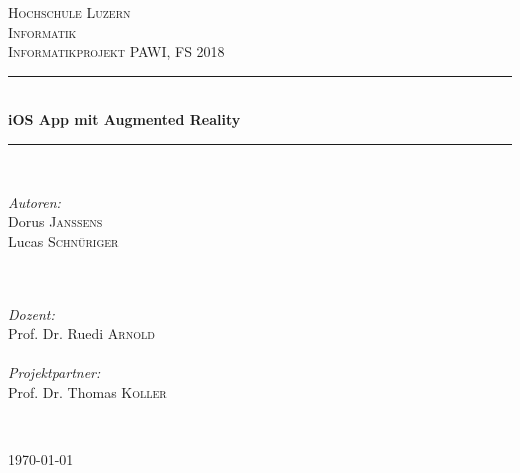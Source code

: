 \documentclass[11pt]{article} %
\begin{document}
\begin{titlepage}

\newcommand{\HRule}{\rule{\linewidth}{0.5mm}} %

\center

\textsc{\LARGE Hochschule Luzern\\Informatik}\\[1.5cm] %
\textsc{\Large Informatikprojekt PAWI, FS 2018}\\[1.5cm] %

\HRule \\[1cm]
{\huge \bfseries iOS App mit Augmented Reality}\\[0.6cm] %
\HRule \\[1cm]

\vspace{30pt}

\begin{minipage}{0.4\textwidth}
  \begin{flushleft} \large
    \emph{Autoren:}\\
    Dorus \textsc{Janssens}\\
    Lucas \textsc{Schnüriger}\\
    ~\\~ %
  \end{flushleft}
\end{minipage}
\begin{minipage}{0.4\textwidth}
  \begin{flushleft} \large
    \emph{Dozent:}\\
    Prof. Dr. Ruedi \textsc{Arnold}\\~\\
    \emph{Projektpartner:}\\
    Prof. Dr. Thomas \textsc{Koller}
  \end{flushleft}
\end{minipage}\\[1cm]


\vspace{30pt}

{\large \today }\\[1cm] %

\end{titlepage}
\end{document}
